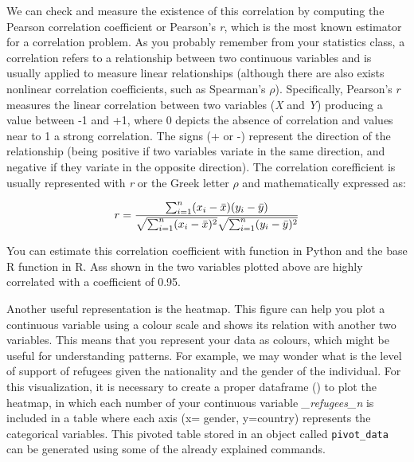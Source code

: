 We can check and measure the existence of this correlation by computing the Pearson correlation coefficient or Pearson's \emph{r}, which is the most known estimator for a correlation problem. As you probably remember from your statistics class, a correlation refers to a relationship between two continuous variables and is usually applied to measure linear relationships (although there are also exists nonlinear correlation coefficients, such as Spearman's $\rho$). Specifically, Pearson's $r$  measures the linear correlation between two variables (\emph{X} and \emph{Y}) producing a value between -1 and +1, where 0 depicts the absence of correlation and values near to 1 a strong correlation. The signs (+ or -) represent the direction of the relationship (being positive if two variables variate in the same direction, and negative if they variate in the opposite direction). The correlation corefficient is usually represented with \emph{r} or the Greek letter $\rho$ and mathematically expressed as:

$$
  r =
  \frac{ \sum_{i=1}^{n}(x_i-\bar{x})(y_i-\bar{y}) }{%
        \sqrt{\sum_{i=1}^{n}(x_i-\bar{x})^2}\sqrt{\sum_{i=1}^{n}(y_i-\bar{y})^2}}
$$

You can estimate this correlation coefficient with  function  in Python and the base R function  in R. Ass shown in  the two variables plotted above are highly correlated with a coefficient of 0.95.


Another useful representation is the heatmap. This figure can help you plot a continuous variable using a colour scale and shows its relation with another two variables.  This means that you represent your data as colours, which might be useful for understanding patterns. For example, we may wonder what is the level of support of refugees given the nationality and the gender of the individual. For this visualization, it is necessary to create a proper dataframe () to plot the heatmap, in which each number of your continuous variable \emph{\_refugees\_n} is included in a table where each axis (x= gender, y=country) represents the categorical variables. This pivoted table stored in an object called \texttt{pivot\_data} can be generated using some of the already explained commands.


